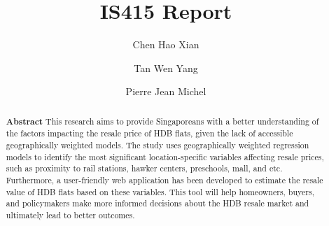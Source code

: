 \documentclass[manuscript,screen]{acmart}
\begin{document}
\title{IS415 Report}



  \author{Chen Hao Xian}
  
    \author{Tan Wen Yang}
  
    \author{Pierre Jean Michel}
  
      

\begin{abstract}
\textbf{Abstract} This research aims to provide Singaporeans with a
better understanding of the factors impacting the resale price of HDB
flats, given the lack of accessible geographically weighted models. The
study uses geographically weighted regression models to identify the
most significant location-specific variables affecting resale prices,
such as proximity to rail stations, hawker centers, preschools, mall,
and etc. Furthermore, a user-friendly web application has been developed
to estimate the resale value of HDB flats based on these variables. This
tool will help homeowners, buyers, and policymakers make more informed
decisions about the HDB resale market and ultimately lead to better
outcomes.    
\end{abstract}


\end{document}
